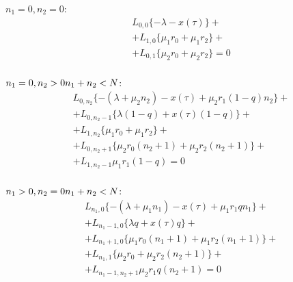 $n_{1}=0, n_{2}=0$:\\
\begin{equation}\label{rEquationLong0}
	\begin{split}
		&L_{0, 0}\{-\lambda - x(\tau)\}+\\
		&+L_{1 , 0}\{\mu_{1} r_{0}+ \mu_{1} r_{2}\}+\\
		&+L_{0, 1 }\{ \mu_{2} r_{0}  + \mu_{2} r_{2}\}=0\\
	\end{split}
\end{equation}

$n_{1}=0, n_{2} > 0\\
n_{1}+n_{2}< N$:\\
\begin{equation}\label{rEquationLong1}
	\begin{split}
		&L_{0, n_{2}}\{-(\lambda+\mu_{2}n_{2}) - x(\tau)+  \mu_{2}r_{1}(1-q)n_{2}\}+\\
		&+L_{0, n_{2}-1}\{\lambda (1-q) + x(\tau) (1-q) \}+\\
		&+L_{1 , n_{2}}\{\mu_{1} r_{0} + \mu_{1} r_{2} \}+\\
		&+L_{0, n_{2} + 1 }\{ \mu_{2} r_{0} (n_{2}+1) + \mu_{2} r_{2} (n_{2}+1)\}+\\
		&+L_{1 , n_{2}-1}\mu_{1} r_{1}(1-q) =0\\
	\end{split}
\end{equation}

$n_{1}>0, n_{2} = 0\\
n_{1}+n_{2}< N$:\\
\begin{equation}\label{rEquationLong2}
	\begin{split}
		&L_{n_{1},0}\{-(\lambda+\mu_{1}n_{1}) - x(\tau) + \mu_{1}r_{1}qn_{1}\}+\\
		&+L_{n_{1}-1, 0}\{\lambda q+ x(\tau) q  \}+\\
		&+L_{n_{1} +1 , 0}\{ \mu_{1} r_{0}(n_{1}+1) + \mu_{1} r_{2} (n_{1}+1)\}+\\
		&+L_{n_{1}, 1 }\{ \mu_{2} r_{0}  + \mu_{2} r_{2} (n_{2}+1)\}+\\
		&+L_{n_{1} -1 , n_{2}+1}\mu_{2} r_{1}q(n_{2}+1) =0
	\end{split}
\end{equation}

